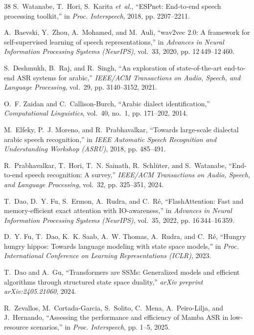 \documentclass[journal]{IEEEtran}
\begin{document}
\begin{thebibliography}{38}
S.~Watanabe, T.~Hori, S.~Karita \emph{et~al.}, ``{ESPnet}: End-to-end speech
  processing toolkit,'' in \emph{Proc. Interspeech}, 2018, pp. 2207--2211.

A.~Baevski, Y.~Zhou, A.~Mohamed, and M.~Auli, ``wav2vec 2.0: A framework for
  self-supervised learning of speech representations,'' in \emph{Advances in
  Neural Information Processing Systems (NeurIPS)}, vol.~33, 2020, pp.
  12\,449--12\,460.

S.~Deshmukh, B.~Raj, and R.~Singh, ``An exploration of state-of-the-art
  end-to-end {ASR} systems for arabic,'' \emph{IEEE/ACM Transactions on Audio,
  Speech, and Language Processing}, vol.~29, pp. 3140--3152, 2021.

O.~F. Zaidan and C.~Callison-Burch, ``Arabic dialect identification,''
  \emph{Computational Linguistics}, vol.~40, no.~1, pp. 171--202, 2014.

M.~Elfeky, P.~J. Moreno, and R.~Prabhavalkar, ``Towards large-scale dialectal
  arabic speech recognition,'' in \emph{IEEE Automatic Speech Recognition and
  Understanding Workshop (ASRU)}, 2018, pp. 485--491.

R.~Prabhavalkar, T.~Hori, T.~N. Sainath, R.~Schl{\"u}ter, and S.~Watanabe,
  ``End-to-end speech recognition: A survey,'' \emph{IEEE/ACM Transactions on
  Audio, Speech, and Language Processing}, vol.~32, pp. 325--351, 2024.

T.~Dao, D.~Y. Fu, S.~Ermon, A.~Rudra, and C.~R{\'e}, ``{FlashAttention}: Fast
  and memory-efficient exact attention with {IO}-awareness,'' in \emph{Advances
  in Neural Information Processing Systems (NeurIPS)}, vol.~35, 2022, pp.
  16\,344--16\,359.

D.~Y. Fu, T.~Dao, K.~K. Saab, A.~W. Thomas, A.~Rudra, and C.~R{\'e}, ``Hungry
  hungry hippos: Towards language modeling with state space models,'' in
  \emph{Proc. International Conference on Learning Representations (ICLR)},
  2023.

T.~Dao and A.~Gu, ``Transformers are {SSMs}: Generalized models and efficient
  algorithms through structured state space duality,'' \emph{arXiv preprint
  arXiv:2405.21060}, 2024.

R.~Zevallos, M.~Cortada-Garcia, S.~Solito, C.~Mena, A.~Peiro-Lilja, and J.~Hernando,
  ``Assessing the performance and efficiency of {Mamba} {ASR} in low-resource scenarios,''
  in \emph{Proc. Interspeech}, pp. 1--5, 2025.


\end{thebibliography}
\end{document}
